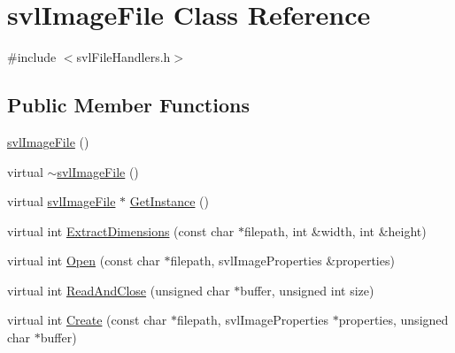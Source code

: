 \hypertarget{classsvl_image_file}{\section{svl\-Image\-File Class Reference}
\label{classsvl_image_file}
}


{\ttfamily \#include $<$svl\-File\-Handlers.\-h$>$}

\subsection*{Public Member Functions}
\begin{DoxyCompactItemize}
\item 
\hyperlink{classsvl_image_file_a45da6f69a4fe633c27477fd0cf6fc15e}{svl\-Image\-File} ()
\item 
virtual \hyperlink{classsvl_image_file_a024c6d61850584580e1d8ab20103214e}{$\sim$svl\-Image\-File} ()
\item 
virtual \hyperlink{classsvl_image_file}{svl\-Image\-File} $\ast$ \hyperlink{classsvl_image_file_a8f3cc8b6e9bab2c175a8400cfcc7ec5d}{Get\-Instance} ()
\item 
virtual int \hyperlink{classsvl_image_file_ae73d26ac85ab2923085412ed973bd215}{Extract\-Dimensions} (const char $\ast$filepath, int \&width, int \&height)
\item 
virtual int \hyperlink{classsvl_image_file_a6f6232f3acdd26a9651c5a8d5ed5246f}{Open} (const char $\ast$filepath, svl\-Image\-Properties \&properties)
\item 
virtual int \hyperlink{classsvl_image_file_ace5d76bf4042d917acefbbe785be24c8}{Read\-And\-Close} (unsigned char $\ast$buffer, unsigned int size)
\item 
virtual int \hyperlink{classsvl_image_file_a6f9104f421b3b11562112c5f7fc6296b}{Create} (const char $\ast$filepath, svl\-Image\-Properties $\ast$properties, unsigned char $\ast$buffer)
\end{DoxyCompactItemize}


